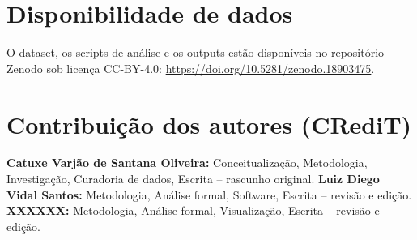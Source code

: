 \documentclass[preprint,12pt,authoryear]{elsarticle}
\begin{document}
\section*{Disponibilidade de dados}

O dataset, os scripts de análise e os outputs estão disponíveis no repositório Zenodo sob licença CC-BY-4.0: \url{https://doi.org/10.5281/zenodo.18903475}.


\section*{Contribuição dos autores (CRediT)}

\textbf{Catuxe Varjão de Santana Oliveira:} Conceitualização, Metodologia, Investigação, Curadoria de dados, Escrita -- rascunho original. \textbf{Luiz Diego Vidal Santos:} Metodologia, Análise formal, Software, Escrita -- revisão e edição. \textbf{XXXXXX:} Metodologia, Análise formal, Visualização, Escrita -- revisão e edição.





\end{document}
